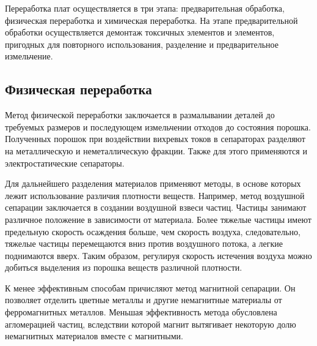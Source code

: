 \documentclass[14pt,oneside,final]{extreport}
\begin{document}
	Переработка плат осуществляется в три этапа: предварительная обработка, физическая переработка и химическая переработка. На этапе предварительной обработки осуществляется демонтаж токсичных элементов и элементов, пригодных для повторного использования, разделение и предварительное измельчение. 
	
	\subsection{Физическая переработка}
	Метод физической переработки заключается в размалывании деталей до требуемых размеров и последующем измельчении отходов до состояния порошка. Полученных порошок при воздействии вихревых токов в сепараторах разделяют на металлическую и неметаллическую фракции. Также для этого применяются и электростатические сепараторы. 
	
	Для дальнейшего разделения материалов применяют методы, в основе которых лежит использование различия плотности веществ. Например, метод воздушной сепарации заключается в создании воздушной взвеси частиц. Частицы занимают различное положение в зависимости от материала. Более тяжелые частицы имеют предельную скорость осаждения больше, чем скорость воздуха, следовательно, тяжелые частицы перемещаются вниз против воздушного потока, а легкие поднимаются вверх. Таким образом, регулируя скорость истечения воздуха можно добиться выделения из порошка веществ различной плотности.
	
	К менее эффективным способам причисляют метод магнитной сепарации. Он позволяет отделить цветные металлы и другие немагнитные материалы от ферромагнитных металлов. Меньшая эффективность метода обусловлена агломерацией частиц, вследствии которой магнит вытягивает некоторую долю немагнитных материалов вместе с магнитными.   
	
	\renewcommand{\bibname}{\centerline{\large{Список литературы}}}
	 

	
\end{document}

